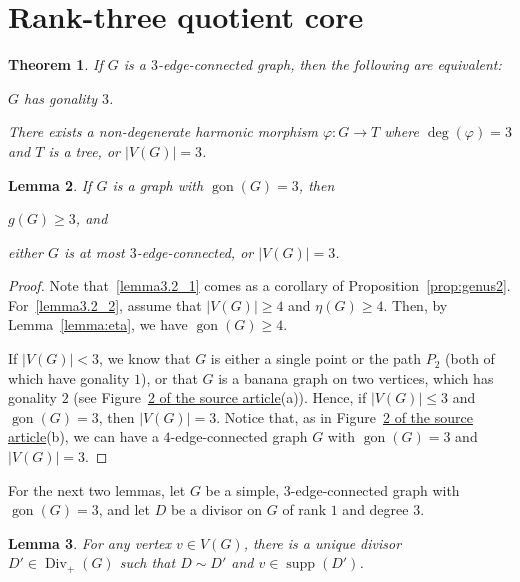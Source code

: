 \documentclass[10pt]{amsart}
\newtheorem{theorem}{Theorem}[section]
\newtheorem{lemma}[theorem]{Lemma}
\renewenvironment{enumerate}[1][]{\if\relax\detokenize{#1}\relax\sourceenumerate\else\sourceenumerate[label=#1]\fi}{\endsourceenumerate}
\DeclareMathOperator{\gon}{gon}
\DeclareMathOperator{\Div}{Div}
\DeclareMathOperator{\supp}{supp}
\begin{document}
\section{Rank-three quotient core}\label{section:multi}
\begin{theorem}
\label{thm:multigraph}
If $G$ is a $3$-edge-connected graph, then the following are equivalent:
\begin{enumerate}
 \item\label{theo3.1_1} $G$ has gonality $3$.
 \item\label{theo3.1_2} There exists a non-degenerate harmonic morphism $\varphi : G \to T$ where $\deg (\varphi) = 3$ and $T$ is a tree, or $|V(G)| = 3$.
\end{enumerate}
\end{theorem}
\begin{lemma}
\label{prop:allgon3}
If $G$ is a graph with $\gon (G) = 3$, then
\begin{enumerate}
 \item\label{lemma3.2_1} $g(G) \geq 3$, and
 \item\label{lemma3.2_2} either $G$ is at most $3$-edge-connected, or $|V(G)| = 3$.
\end{enumerate}
\end{lemma}

\begin{proof}
Note that~\eqref{lemma3.2_1} comes as a corollary of Proposition~\ref{prop:genus2}. For~\eqref{lemma3.2_2}, assume that $|V(G)| \geq 4$ and $\eta(G) \geq 4$. Then, by Lemma~\ref{lemma:eta}, we have $\gon (G) \geq 4$. 


If $|V(G)| < 3$, we know that $G$ is either a single point or the path $P_2$ (both of which have gonality $1$), or that $G$ is a banana graph on two vertices, which has gonality $2$ (see Figure~\href{https://alco.centre-mersenne.org/item/10.5802/alco.80.pdf#page=8}{2 of the source article}(a)). Hence, if $|V(G)| \leq 3$ and $\gon (G) = 3$, then $|V(G)| = 3$. Notice that, as in Figure~\href{https://alco.centre-mersenne.org/item/10.5802/alco.80.pdf#page=8}{2 of the source article}(b), we can have a $4$-edge-connected graph $G$ with $\gon (G) = 3$ and $|V(G)| = 3$.
\end{proof}
For the next two lemmas, let $G$ be a simple, $3$-edge-connected graph with $\gon (G)=3$, and let $D$ be a divisor on $G$ of rank $1$ and degree $3$.

\begin{lemma}
\label{lemma:distinctorbits}
For any vertex $v\in V(G)$, there is a unique divisor $D' \in \Div _+(G)$ such that $D \sim D'$ and $v \in \supp (D')$.
\end{lemma}
\end{document}

